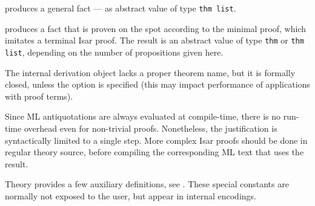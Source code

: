\begin{isabellebody}
\begin{isamarkuptext}
\begin{description}
  \item {} produces a general fact --- as abstract
  value of type \verb|thm list|.

  \item {} produces a fact that is proven on
  the spot according to the minimal proof, which imitates a terminal
  Isar proof.  The result is an abstract value of type \verb|thm|
  or \verb|thm list|, depending on the number of propositions
  given here.

  The internal derivation object lacks a proper theorem name, but it
  is formally closed, unless the  option is specified
  (this may impact performance of applications with proof terms).

  Since ML antiquotations are always evaluated at compile-time, there
  is no run-time overhead even for non-trivial proofs.  Nonetheless,
  the justification is syntactically limited to a single \hyperlink{command.by}{\mbox{}} step.  More complex Isar proofs should be done in regular
  theory source, before compiling the corresponding ML text that uses
  the result.

  \end{description}%
\end{isamarkuptext}%
\isamarkuptrue%
%
\endisatagmlantiq
{\isafoldmlantiq}%
%
\isadelimmlantiq
%
\endisadelimmlantiq
%
\isamarkuptrue%
%
\begin{isamarkuptext}%
Theory  provides a few auxiliary definitions, see
  .  These special constants are normally not
  exposed to the user, but appear in internal encodings.


\end{isamarkuptext}
\end{isabellebody}
